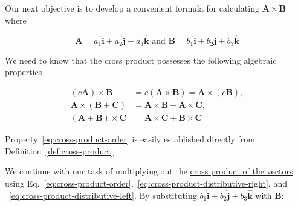 Our next objective is to develop a convenient formula for calculating $\boldsymbol{A} \times \boldsymbol{B}$ where

\begin{equation}\label{eq:cross-product-of-two}
    \boldsymbol{A} = a_1\boldsymbol{\hat{i}} + a_2\boldsymbol{\hat{j}} + a_3\boldsymbol{\hat{k}} \text{\ \ \ \ \ \ and \ \ \ \ \ \ }
    \boldsymbol{B} = b_1\boldsymbol{\hat{i}} + b_2\boldsymbol{\hat{j}} + b_3\boldsymbol{\hat{k}}
\end{equation}

We need to know that the cross product possesses the following algebraic properties

\begin{align}
    (c\boldsymbol{A}) \times \boldsymbol{B} &= c(\boldsymbol{A} \times \boldsymbol{B}) = \boldsymbol{A} \times (c\boldsymbol{B})\label{eq:cross-product-order}, \\
    \boldsymbol{A} \times (\boldsymbol{B} + \boldsymbol{C}) &= \boldsymbol{A} \times \boldsymbol{B} + \boldsymbol{A} \times \boldsymbol{C}\label{eq:cross-product-distributive-right}, \\
    (\boldsymbol{A} + \boldsymbol{B}) \times \boldsymbol{C} &= \boldsymbol{A} \times \boldsymbol{C} + \boldsymbol{B} \times \boldsymbol{C}\label{eq:cross-product-distributive-left}
\end{align}

Property~\ref{eq:cross-product-order} is easily established directly from Definition~\ref{def:cross-product}

We continue with our task of multiplying out the \hyperref[eq:cross-product-of-two]{cross product of the vectors} using
Eq.~\ref{eq:cross-product-order},~\ref{eq:cross-product-distributive-right}, and ~\ref{eq:cross-product-distributive-left}.
By substituting $b_1\boldsymbol{\hat{i}} + b_2\boldsymbol{\hat{j}} + b_3\boldsymbol{\hat{k}}$ with $\boldsymbol{B}$:

